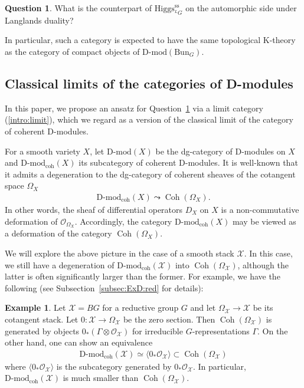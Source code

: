 \documentclass [11pt,oneside,a4paper,mathscr]{amsart}
\theoremstyle{definition}
\newtheorem{example}[thm]{Example}
\newtheorem{quest}[thm]{Question}
\newcommand{\X}{\mathcal{X}}
\newcommand{\Coh}{\operatorname{Coh}}
\newcommand{\Hig}{\mathrm{Higgs}}
\newcommand{\Bun}{\mathrm{Bun}}
\begin{document}
\begin{quest}\label{question} What is the counterpart of $\Hig^{\mathrm{ss}}_{^{L}G}$ on the automorphic side under Langlands duality? \end{quest}

In particular, such a category is expected to have the same topological K-theory as the category of compact objects of $\text{D-mod}(\Bun_G)$.



\subsection{Classical limits of the categories of D-modules}\label{subsec:limit}
In this paper, we propose an ansatz for Question~\ref{question} via a limit category (\ref{intro:limit}), which we regard as a version of the classical limit 
of the category of coherent D-modules. 

For a smooth variety $X$, let $\text{D-mod}(X)$ be the dg-category of 
D-modules on $X$ and $\text{D-mod}_{\mathrm{coh}}(X)$ its subcategory of 
coherent D-modules. It is well-known that it admits a degeneration 
to the dg-category of coherent sheaves of the cotangent space $\Omega_X$
\begin{align*}
    \text{D-mod}_{\mathrm{coh}}(X) \leadsto \Coh(\Omega_X). 
\end{align*}
In other words, the sheaf of differential operators $D_X$ on $X$ is a non-commutative 
deformation of $\mathcal{O}_{\Omega_X}$. Accordingly, the category $\text{D-mod}_{\mathrm{coh}}(X)$ may be viewed as a deformation of the category $\Coh(\Omega_X)$.

We will explore the above picture in the case of a smooth 
stack $\X$. In this case, we still have a degeneration of 
$\text{D-mod}_{\mathrm{coh}}(\X)$ into $\Coh(\Omega_{\X})$, 
although the latter is often significantly larger than the former.
For example, we have the following (see Subsection~\ref{subsec:ExD:red} for details):
\begin{example}
Let $\X=BG$ for a reductive group $G$
and let $\Omega_{\X} \to \X$ be its cotangent stack. Let $0\colon \X \to \Omega_{\X}$ be the 
zero section. Then 
$\Coh(\Omega_{\X})$ is generated by objects $0_{*}(\Gamma\otimes \mathcal{O}_{\X})$ for irreducible 
$G$-representations $\Gamma$. On the other hand, one can show an equivalence 
\begin{align}\label{intro:equivD}
    \text{D-mod}_{\mathrm{coh}}(\X)\simeq \langle 0_{*}\mathcal{O}_{\X} \rangle \subset 
    \Coh(\Omega_{\X})
\end{align}
where $\langle 0_{*}\mathcal{O}_{\X}\rangle$ is the subcategory generated by $0_{*}\mathcal{O}_{\X}$. 
In particular, $\text{D-mod}_{\mathrm{coh}}(\X)$ is much smaller than $\Coh(\Omega_{\X})$.
\end{example}
\end{document}
